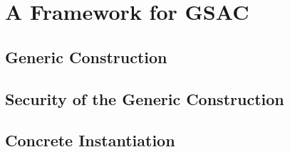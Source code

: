 \section{A Framework for GSAC}
\label{sec:construction}

\subsection{Generic Construction}
\label{ssec:framework}

\subsection{Security of the Generic Construction}
\label{ssec:proofs}

\subsection{Concrete Instantiation}
\label{ssec:instantiation}

